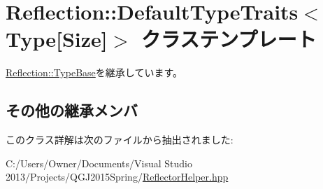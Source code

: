 \hypertarget{class_reflection_1_1_default_type_traits_3_01_type[_size]_4}{}\section{Reflection\+:\+:Default\+Type\+Traits$<$ Type\mbox{[}Size\mbox{]}$>$ クラステンプレート}
\label{class_reflection_1_1_default_type_traits_3_01_type[_size]_4}


\hyperlink{class_reflection_1_1_type_base}{Reflection\+::\+Type\+Base}を継承しています。

\subsection*{その他の継承メンバ}


このクラス詳解は次のファイルから抽出されました\+:\begin{DoxyCompactItemize}
\item 
C\+:/\+Users/\+Owner/\+Documents/\+Visual Studio 2013/\+Projects/\+Q\+G\+J2015\+Spring/\hyperlink{_reflector_helper_8hpp}{Reflector\+Helper.\+hpp}\end{DoxyCompactItemize}
